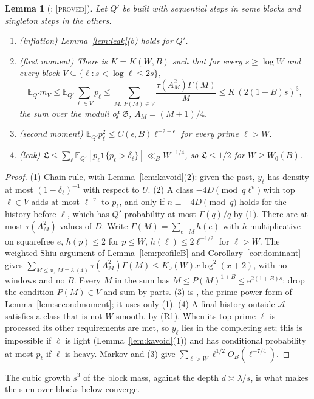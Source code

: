 \documentclass[10pt,reqno]{amsart}
\newtheorem{lemma}[theorem]{Lemma}
\theoremstyle{definition}
\theoremstyle{remark}
\newcommand{\A}{\mathcal A}
\newcommand{\cG}{\mathfrak G}
\newcommand{\E}{\mathbb E}
\newcommand{\ind}{\mathbf 1}
\newcommand{\e}{\mathrm e}
\newcommand{\lab}[1]{\textup{[\textsc{#1}]}}
\begin{document}
\begin{lemma}[{\cite[Lemmas~4.2, 4.2$'$, 4.3]{KA}}; \lab{proved}]\label{lem:kmoments}
Let $Q'$ be built with sequential steps in some blocks and singleton steps
in the others.
\begin{enumerate}
\item (inflation) Lemma~\ref{lem:leak}(b) holds for $Q'$.
\item (first moment) There is $K=K(W,B)$ such that for every $s\geq\log W$
  and every block $V\subseteq\{\ell:s<\log\ell\leq2s\}$,
  \[
   \E_{Q'}m_V\leq\E_{Q'}\sum_{\ell\in V}p_\ell\leq\sum_{M:\,P(M)\in V}\frac{\tau(A_M^2)\Gamma(M)}M\leq K\,(2(1+B)s)^3,
  \]
  the sum over the moduli of $\cG$, $A_M=(M+1)/4$.
\item (second moment) $\E_{Q'}p_\ell^2\leq C(\epsilon,B)\ell^{-2+\epsilon}$ for
  every prime $\ell>W$.
\item (leak) $\mathfrak L\leq\sum_\ell\E_{Q'}[p_\ell\ind\{p_\ell>\delta_\ell\}]\ll_BW^{-1/4}$,
  so $\mathfrak L\leq1/2$ for $W\geq W_0(B)$.
\end{enumerate}
\end{lemma}
\begin{proof}
(1) Chain rule, with Lemma~\ref{lem:kavoid}(2): given the past, $y_\ell$
has density at most $(1-\delta_\ell)^{-1}$ with respect to $U$.
(2) A class $-4D\pmod{q\ell^v}$ with top $\ell\in V$ adds at most $\ell^{-v}$
to $p_\ell$, and only if $n\equiv-4D\pmod q$ holds for the history before
$\ell$, which has $Q'$-probability at most $\Gamma(q)/q$ by (1).  There
are at most $\tau(A_M^2)$ values of $D$.  Write
$\Gamma(M)=\sum_{e\mid M}h(e)$ with $h$ multiplicative on squarefree $e$,
$h(p)\leq2$ for $p\leq W$, $h(\ell)\leq2\ell^{-1/2}$ for $\ell>W$.  The
weighted Shiu argument of Lemma~\ref{lem:profileB} and
Corollary~\ref{cor:dominant} gives
$\sum_{M\leq x,\ M\equiv3\ (4)}\tau(A_M^2)\Gamma(M)\leq K_0(W)x\log^2(x+2)$, with
no windows and no $B$.  Every $M$ in the sum has
$M\leq P(M)^{1+B}\leq\e^{2(1+B)s}$; drop the condition $P(M)\in V$ and sum
by parts.  (3) is \cite[Lemma~4.0]{TW}, the prime-power form of
Lemma~\ref{lem:secondmoment}; it uses only (1).  (4) A final history
outside $\A$ satisfies a class that is not $W$-smooth, by (R1).  When its
top prime $\ell$ is processed its other requirements are met, so $y_\ell$
lies in the completing set; this is impossible if $\ell$ is light
(Lemma~\ref{lem:kavoid}(1)) and has conditional probability at most
$p_\ell$ if $\ell$ is heavy.  Markov and (3) give
$\sum_{\ell>W}\ell^{1/2}O_B(\ell^{-7/4})$.
\end{proof}
The cubic growth $s^3$ of the block mass, against the depth
$d\asymp\lambda/s$, is what makes the sum over blocks below converge.
\end{document}
